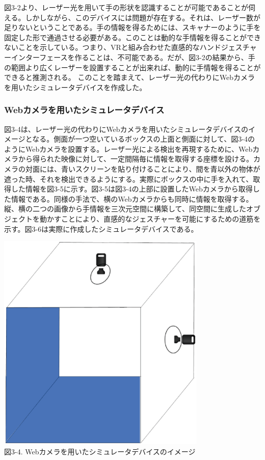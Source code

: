図3-2より、レーザー光を用いて手の形状を認識することが可能であることが伺える。しかしながら、このデバイスには問題が存在する。それは、レーザー数が足りないということである。手の情報を得るためには、スキャナーのように手を固定した形で通過させる必要がある。このことは動的な手情報を得ることができないことを示している。つまり、VRと組み合わせた直感的なハンドジェスチャーインターフェースを作ることは、不可能である。だが、図3-2の結果から、手の範囲より広くレーザーを設置することが出来れば、動的に手情報を得ることができると推測される。%
このことを踏まえて、レーザー光の代わりにWebカメラを用いたシミュレータデバイスを作成した。

\subsubsection{Webカメラを用いたシミュレータデバイス}
図3-4は、レーザー光の代わりにWebカメラを用いたシミュレータデバイスのイメージとなる。側面が一つ空いているボックスの上面と側面に対して、図3-4のようにWebカメラを設置する。レーザー光による検出を再現するために、Webカメラから得られた映像に対して、一定間隔毎に情報を取得する座標を設ける。カメラの対面には、青いスクリーンを貼り付けることにより、間を青以外の物体が遮った時、それを検出できるようにする。実際にボックスの中に手を入れて、取得した情報を図3-5に示す。図3-5は図3-4の上部に設置したWebカメラから取得した情報である。同様の手法で、横のWebカメラからも同時に情報を取得する。縦、横の二つの画像から手情報を三次元空間に構築して、同空間に生成したオブジェクトを動かすことにより、直感的なジェスチャーを可能にするための道筋を示す。図3-6は実際に作成したシミュレータデバイスである。

\begin{center}
  \includegraphics[width=10cm]{Simulator_image.eps} \\

 \vspace{1mm}
  図3-4. Webカメラを用いたシミュレータデバイスのイメージ
\end{center}

